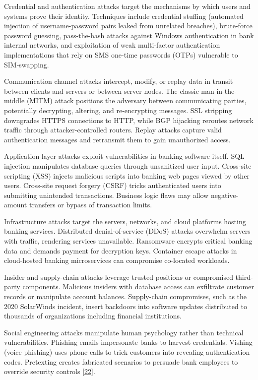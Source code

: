 \indent Credential and authentication attacks target the mechanisms by which users and systems prove their identity. Techniques include credential stuffing (automated injection of username-password pairs leaked from unrelated breaches), brute-force password guessing, pass-the-hash attacks against Windows authentication in bank internal networks, and exploitation of weak multi-factor authentication implementations that rely on SMS one-time passwords (OTPs) vulnerable to SIM-swapping.

\indent Communication channel attacks intercept, modify, or replay data in transit between clients and servers or between server nodes. The classic man-in-the-middle (MITM) attack positions the adversary between communicating parties, potentially decrypting, altering, and re-encrypting messages. SSL stripping downgrades HTTPS connections to HTTP, while BGP hijacking reroutes network traffic through attacker-controlled routers. Replay attacks capture valid authentication messages and retransmit them to gain unauthorized access.

\indent Application-layer attacks exploit vulnerabilities in banking software itself. SQL injection manipulates database queries through unsanitized user input. Cross-site scripting (XSS) injects malicious scripts into banking web pages viewed by other users. Cross-site request forgery (CSRF) tricks authenticated users into submitting unintended transactions. Business logic flaws may allow negative-amount transfers or bypass of transaction limits.

\indent Infrastructure attacks target the servers, networks, and cloud platforms hosting banking services. Distributed denial-of-service (DDoS) attacks overwhelm servers with traffic, rendering services unavailable. Ransomware encrypts critical banking data and demands payment for decryption keys. Container escape attacks in cloud-hosted banking microservices can compromise co-located workloads.

\indent Insider and supply-chain attacks leverage trusted positions or compromised third-party components. Malicious insiders with database access can exfiltrate customer records or manipulate account balances. Supply-chain compromises, such as the 2020 SolarWinds incident, insert backdoors into software updates distributed to thousands of organizations including financial institutions.

\indent Social engineering attacks manipulate human psychology rather than technical vulnerabilities. Phishing emails impersonate banks to harvest credentials. Vishing (voice phishing) uses phone calls to trick customers into revealing authentication codes. Pretexting creates fabricated scenarios to persuade bank employees to override security controls \hyperref[ref:22]{[22]}.

